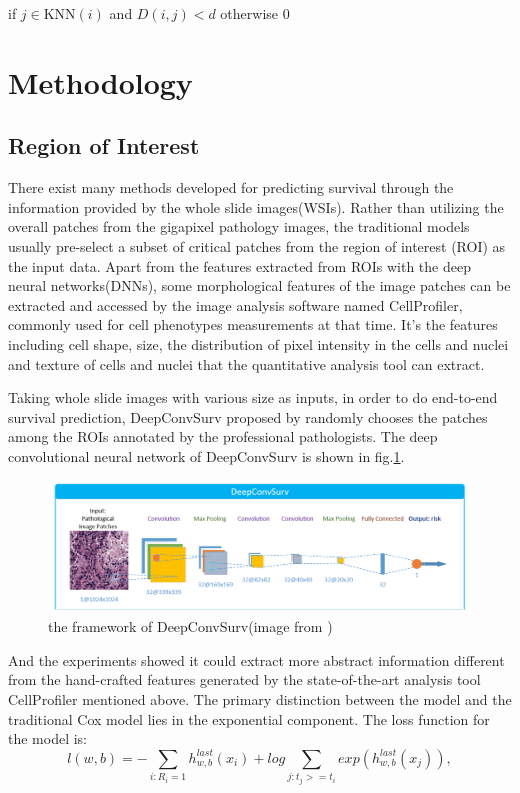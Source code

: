 \documentclass[journal,twoside,web]{ieeecolor}
\begin{document}
if $j\in $KNN$( i) $ and $D(i,j)<d$  otherwise 0

\section{Methodology}
\subsection{Region of Interest}
There exist many methods developed for predicting survival through the information provided by the whole slide images(WSIs).
Rather than utilizing the overall patches from the gigapixel pathology images, the traditional models usually pre-select a subset of critical patches from the region of interest (ROI) as the input data.
Apart from the features extracted from ROIs with the deep neural networks(DNNs), some morphological features of the image patches can be extracted and accessed by the image analysis software named CellProfiler\cite{lamprecht2007cellprofiler}, commonly used for cell phenotypes measurements at that time.
It's the features including cell shape, size, the distribution of pixel intensity in the cells and nuclei and texture of cells and nuclei that the quantitative analysis tool can extract.

Taking whole slide images with various size as inputs, in order to do end-to-end survival prediction, DeepConvSurv proposed by \cite{zhu2016deep} randomly chooses the patches among the ROIs annotated by the professional pathologists.
The deep convolutional neural network of DeepConvSurv is shown in fig.\ref{DeepConvSurv}.
\begin{figure}
    \centering
    \includegraphics[width=0.8\linewidth]{img/deepconvsurv.png}
    \caption{the framework of DeepConvSurv(image from \cite{zhu2016deep})}
    \label{DeepConvSurv}
\end{figure}
And the experiments showed it could extract more abstract information different from the hand-crafted features generated by the state-of-the-art analysis tool CellProfiler mentioned above.
The primary distinction between the model and the traditional Cox model lies in the exponential component. The loss function for the model is:
\begin{equation}
l(w,b)=-\sum_{i:R_i=1}h_{w,b}^{last}(x_i)+log\sum_{j:t_j>=t_i}exp(h_{w,b}^{last}(x_j)),
\end{equation}
\end{document}
